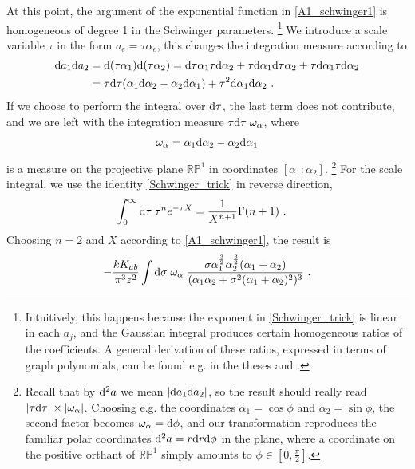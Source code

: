 \documentclass[11pt]{amsart}
\numberwithin{equation}{section}
\numberwithin{figure}{section}
\numberwithin{table}{section}
\begin{document}
At this point, the argument of the exponential function  in \cref{A1_schwinger1} is  homogeneous of degree 1 in the Schwinger parameters.%
%
\footnote{Intuitively, this happens  because the exponent in \cref{Schwinger_trick} is linear in each $a_j$, and the Gaussian integral produces certain homogeneous ratios of the coefficients. A general derivation of these ratios, expressed in terms of graph polynomials,   can be found e.g. in the theses \cite[Sec.~2.1]{panzer_feynman_2015} and  \cite[Sec.~1.3.7]{balduf_dyson_2024}.} %
%
We introduce a scale variable $\tau$ in the form $a_e=\tau \alpha_e$, this changes the integration measure according to
\begin{align*}
	\mathrm{d} a_1 \mathrm{d} a_2 &= \mathrm{d} (\tau \alpha_1) \mathrm{d} (\tau \alpha_2) =  \mathrm{d} \tau \alpha_1 \tau \mathrm{d} \alpha_2  + \tau\mathrm{d}  \alpha_1 \mathrm{d} \tau \alpha_2+ \tau \mathrm{d} \alpha_1 \tau \mathrm{d} \alpha_2 \\
	&=\tau \mathrm{d} \tau (\alpha_1 \mathrm{d} \alpha_2 - \alpha_2 \mathrm{d} \alpha_1)  + \tau^2 \mathrm{d} \alpha_1 \mathrm{d} \alpha_2 ~.
\end{align*} 
If we choose to perform the integral over $\mathrm{d} \tau$, the last term does not contribute, and we are left with the integration measure $\tau \mathrm{d} \tau\; \omega_\alpha$, where 
\begin{align}\label{projective_measure_alpha}
	\omega_\alpha=\alpha_1\mathrm{d}\alpha_2 - \alpha_2 \mathrm{d} \alpha_1
\end{align}
is a measure on the  projective plane $\mathbb R \mathbb P^1$ in coordinates $[\alpha_1:\alpha_2]$.%
%
\footnote{Recall that by $\mathrm{d}^2 a$ we mean $|\mathrm{d} a_1 \mathrm{d} a_2|$, so the result should really read $|\tau \mathrm{d} \tau | \times |\omega_\alpha|$. Choosing e.g. the coordinates $\alpha_1 = \cos \phi$ and $\alpha_2=\sin \phi$, the second factor becomes $\omega_\alpha=\mathrm{d} \phi$, and our transformation reproduces the familiar polar coordinates $\mathrm{d}^2 a =r \mathrm{d} r \mathrm{d} \phi$ in the plane, where a coordinate on the positive orthant of $\mathbb R \mathbb P^1$ simply amounts to $\phi \in [0,\frac \pi 2]$.} %
%
For the scale integral, we use the identity \cref{Schwinger_trick} in reverse direction, 
\begin{align}\label{scale_integral}
	\int_0^\infty \mathrm{d} \tau \; \tau^n e^{-\tau X} &= \frac{1}{X^{n+1}}\Gamma(n+1)~.
\end{align} 
Choosing $n=2$ and $X$  according to \cref{A1_schwinger1}, the result is 
\begin{align}\label{A1_integral_projective}
	-\frac{k K_{ab}}{\pi^3 z^2}\int \mathrm{d} \sigma \; \omega_\alpha  \; \frac{\sigma \alpha_1^{\scriptstyle{\frac{3}{2}}} \alpha_2^{\scriptstyle{\frac{3}{2}}}(\alpha_1 + \alpha_2)}{(\alpha_1 \alpha_2 + \sigma^2 (\alpha_1 + \alpha_2)^2)^3}~.
\end{align}
\end{document}
